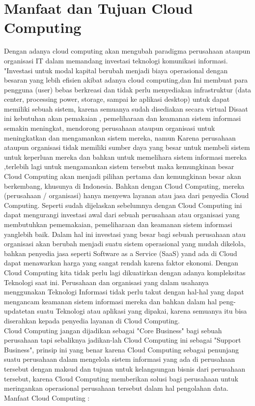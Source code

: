 \section{Manfaat dan Tujuan Cloud Computing}
\tab Dengan adanya cloud computing akan mengubah paradigma perusahaan ataupun organisasi IT dalam memandang investasi teknologi komunikasi informasi. "Investasi untuk modal kapital berubah menjadi biaya operasional dengan besaran yang lebih efisien akibat adanya cloud computing,dan Ini membuat para pengguna (user) bebas berkreasi dan tidak perlu menyediakan infrastruktur (data center, processing power, storage, sampai ke aplikasi desktop) untuk dapat memiliki sebuah sistem, karena semuanya sudah disediakan secara virtual Disaat ini kebutuhan akan pemakaian , pemeliharaan dan keamanan sistem informasi semakin meningkat, mendorong perusahaan ataupun organisasi untuk meningkatkan dan mengamankan sistem mereka, namun Karena perusahaan ataupun organisasi tidak memiliki sumber daya yang besar untuk membeli sistem untuk keperluan mereka dan bahkan untuk memelihara sistem informasi mereka ,terlebih lagi untuk mengamankan sistem tersebut maka kemungkinan besar Cloud Computing akan menjadi pilihan pertama dan kemungkinan besar akan berkembang, khusunya di Indonesia. Bahkan dengan Cloud Computing, mereka (perusahaan / organisasi) hanya menyewa layanan atau jasa dari penyedia Cloud Computing.
\tab Seperti sudah dijelaskan sebelumnya dengan Cloud Computing ini dapat mengurangi investasi awal dari sebuah perusahaan atau organisasi yang membutuhkan pememakaian, pemeliharaan dan keamanan sistem informasi yanglebih baik. Dalam hal ini investasi yang besar bagi sebuah perusahaan atau organisasi akan berubah menjadi suatu sistem operasional yang mudah dikelola, bahkan penyedia jasa seperti Software as a Service (SaaS) yand ada di Cloud dapat menawarkan harga yang sangat rendah karena faktor ekonomi. Dengan Cloud Computing kita tidak perlu lagi dikuatirkan dengan adanya kompleksitas Teknologi saat ini. Perusahaan dan organisasi yang dalam usahanya menggunakan Teknologi Informasi tidak perlu takut dengan hal-hal yang dapat mengancam keamanan sistem informasi mereka dan bahkan dalam hal peng-updatetan suatu Teknologi atau aplikasi yang dipakai, karena semuanya itu bisa diserahkan kepada penyedia layanan di Cloud Computing. \\Cloud Computing jangan dijadikan sebagai "Core Business" bagi sebuah perusahaan tapi sebaliknya jadikan-lah Cloud Computing ini sebagai "Support Business", prinsip ini yang benar karena Cloud Computing sebagai penunjang suatu perusahaan dalam mengelola sistem informasi yang ada di perusahaan tersebut dengan maksud dan tujuan untuk kelangsungan bisnis dari perusahaan tersebut, karena Cloud Computing memberikan solusi bagi perusahaan untuk meringankan operasional perusahaan tersebut dalam hal pengolahan data. \\Manfaat Cloud Computing :
